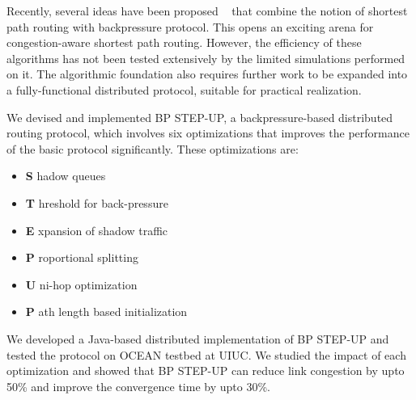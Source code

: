 
Recently, several ideas have been proposed ~\cite{Srikant3, Austin1} that combine the notion of shortest path routing with backpressure protocol. This opens an exciting arena for congestion-aware shortest path routing. However, the efficiency of these algorithms has not been tested extensively by the limited simulations performed on it. The algorithmic foundation also requires further work to be expanded into a fully-functional distributed protocol, suitable for practical realization. 

We devised and implemented BP STEP-UP, a backpressure-based distributed routing protocol, which involves six optimizations that improves the performance of the basic protocol significantly. 
These optimizations are:

\begin{itemize}[noitemsep]
\item[] \textbf{\large S} hadow queues ~\cite{Srikant3}
\item[] \textbf{\large T} hreshold for back-pressure ~\cite{Srikant3}
\item[] \textbf{\large E} xpansion of shadow traffic ~\cite{Srikant3}
\item[] \textbf{\large P} roportional splitting \\
\item[] \textbf{\large U} ni-hop optimization
\item[] \textbf{\large P} ath length based initialization
\end{itemize}
 
We developed a Java-based distributed implementation of BP STEP-UP and tested the protocol on OCEAN testbed at UIUC. We studied the impact of each optimization and showed that BP STEP-UP can reduce link congestion by upto 50\% and improve the convergence time by upto 30\%.